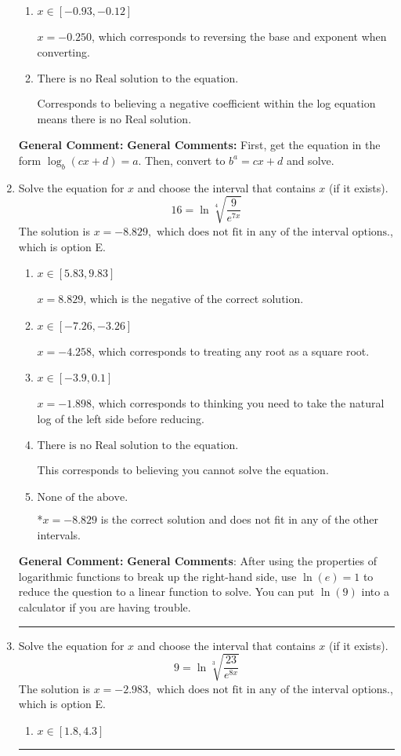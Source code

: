 \documentclass{extbook}[14pt]
\newcommand{\litem}[1]{\item #1

\rule{\textwidth}{0.4pt}}
\begin{document}
\begin{enumerate}
{\begin{enumerate}[label=\Alph*.]
$x = 2.250$, which corresponds to reversing the base and exponent when converting and reversing the value with $x$.
\item \( x \in [-0.93, -0.12] \)

$x = -0.250$, which corresponds to reversing the base and exponent when converting.
\item \( \text{There is no Real solution to the equation.} \)

Corresponds to believing a negative coefficient within the log equation means there is no Real solution.
\end{enumerate}

\textbf{General Comment:} \textbf{General Comments:} First, get the equation in the form $\log_b{(cx+d)} = a$. Then, convert to $b^a = cx+d$ and solve.
}
\litem{
 Solve the equation for $x$ and choose the interval that contains $x$ (if it exists).
\[  16 = \ln{\sqrt[4]{\frac{9}{e^{7x}}}} \]The solution is \( x = -8.829, \text{ which does not fit in any of the interval options.} \), which is option E.\begin{enumerate}[label=\Alph*.]
\item \( x \in [5.83, 9.83] \)

$x = 8.829$, which is the negative of the correct solution.
\item \( x \in [-7.26, -3.26] \)

$x = -4.258$, which corresponds to treating any root as a square root.
\item \( x \in [-3.9, 0.1] \)

$x = -1.898$, which corresponds to thinking you need to take the natural log of the left side before reducing.
\item \( \text{There is no Real solution to the equation.} \)

This corresponds to believing you cannot solve the equation.
\item \( \text{None of the above.} \)

*$x = -8.829$ is the correct solution and does not fit in any of the other intervals.
\end{enumerate}

\textbf{General Comment:} \textbf{General Comments}: After using the properties of logarithmic functions to break up the right-hand side, use $\ln(e) = 1$ to reduce the question to a linear function to solve. You can put $\ln(9)$ into a calculator if you are having trouble.
}
\litem{
 Solve the equation for $x$ and choose the interval that contains $x$ (if it exists).
\[  9 = \ln{\sqrt[3]{\frac{23}{e^{8x}}}} \]The solution is \( x = -2.983, \text{ which does not fit in any of the interval options.} \), which is option E.\begin{enumerate}[label=\Alph*.]
\item \( x \in [1.8, 4.3] \)


\end{enumerate}}
\end{enumerate}
\end{document}
